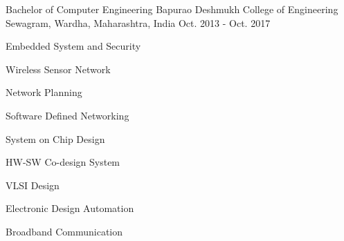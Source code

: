 

\begin{cventries}


  \cventry
    {Bachelor of Computer Engineering} %
    {Bapurao Deshmukh College of Engineering} %
    {Sewagram, Wardha, Maharashtra, India} %
    {Oct. 2013 - Oct. 2017} %
    {
      \begin{cvitems_2} %
          \item {Embedded System and Security}
          \item {Wireless Sensor Network}
          \item {Network Planning}
          \item {Software Defined Networking}
          \item {System on Chip Design}
          \item {HW-SW Co-design System}
          \item {VLSI Design}
          \item {Electronic Design Automation}
          \item {Broadband Communication}
      \end{cvitems_2}
    }


\end{cventries}
